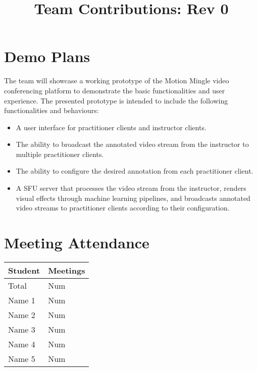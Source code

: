 \documentclass{article}
\title{Team Contributions: Rev 0\\\progname}
\author{\authname}
\date{}
\begin{document}
\maketitle

\section{Demo Plans}

The team will showcase a working prototype of the Motion Mingle video conferencing platform to demonstrate the basic functionalities and user experience. The presented prototype is intended to include the following functionalities and behaviours:
\begin{itemize}
    \item A user interface for practitioner clients and instructor clients.
    \item The ability to broadcast the annotated video stream from the instructor to multiple practitioner clients.
    \item The ability to configure the desired annotation from each practitioner client.
    \item A SFU server that processes the video stream from the instructor, renders visual effects through machine learning pipelines, and broadcasts annotated video streams to practitioner clients according to their configuration.
\end{itemize}
\section{Meeting Attendance}


\begin{table}[H]
\centering
\begin{tabular}{ll}
\toprule
\textbf{Student} & \textbf{Meetings}\\
\midrule
Total & Num\\
Name 1 & Num\\
Name 2 & Num\\
Name 3 & Num\\
Name 4 & Num\\
Name 5 & Num\\
\bottomrule
\end{tabular}
\end{table}
\end{document}
